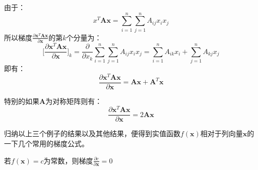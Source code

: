 \documentclass[10pt,a4paper,UTF8]{article}
\begin{document}
\begin{tikzinstance}
由于：
\begin{equation}
\label{eq:11}
x^{T}\mathbf{A}\mathbf{x} = \sum_{i=1}^{n}\sum_{j=1}^{n}A_{ij}x_{i}x_{j}
\end{equation}
所以梯度\(\frac{\partial \mathbf{x}^{T}\mathbf{A}\mathbf{x}}{\partial \mathbf{x}}\)的第\(k\)个分量为：
\begin{equation}
\label{eq:12}
\bigg[ \frac{\partial \mathbf{x}^{T}\mathbf{A}\mathbf{x}}{\partial \mathbf{x}} \bigg]_{k} = \frac{\partial}{\partial x_{k}} \sum_{i=1}^{n}\sum_{j=1}^{n}A_{ij}x_{i}x_{j} = \sum_{i=1}^{n}A_{ik}x_{i} + \sum_{j=1}^{n}A_{kj}x_{j}
\end{equation}
即有：
\begin{equation}
\label{eq:13}
\frac{\partial \mathbf{x}^{T}\mathbf{A}\mathbf{x}}{\partial \mathbf{x}} = \mathbf{A}\mathbf{x} + \mathbf{A}^{T}\mathbf{x}
\end{equation}

特别的如果\(\mathbf{A}\)为对称矩阵则有：
\begin{equation}
\label{eq:14}
\frac{\partial \mathbf{x}^{T}\mathbf{A}\mathbf{x}}{\partial \mathbf{x}} = 2\mathbf{A}\mathbf{x}
\end{equation}
\end{tikzinstance}

归纳以上三个例子的结果以及其他结果，便得到实值函数\(f(\mathbf{x})\)相对于列向量\(\mathbf{x}\)的一下几个常用的梯度公式。
\begin{tikzinstance}
若\(f(\mathbf{x}) = c\)为常数，则梯度\(\frac{\partial c}{\partial \mathbf{x}} = 0\)
\end{tikzinstance}
\end{document}
